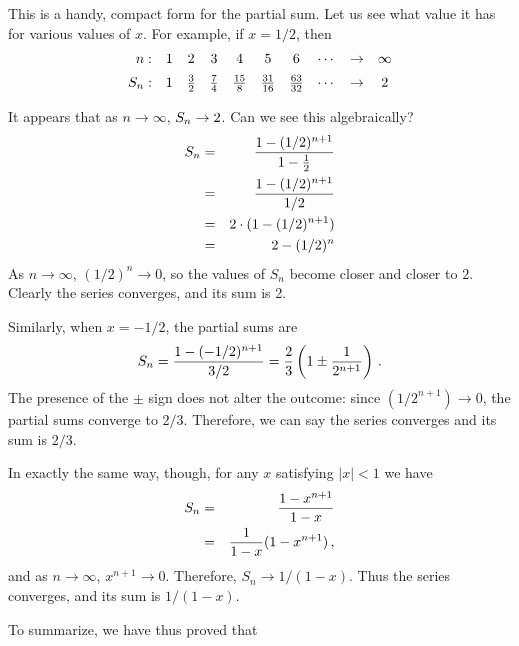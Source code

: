{{{{     This is a handy, compact form for the partial sum.  Let us see what value it has  for various values of $x$.  For example, if $x = 1/2$, then
        \[
\begin{array}{rccccccccc}
        n: & 1 & 2 & 3 & 4 & 5 & 6 & \cdots & \to & \infty
                \\[.07in]
        S_n: & 1 & {3 \over 2}  & {7 \over 4}  & {15 \over 8}  
                & {31 \over 16}  & {63 \over 32}  & \cdots & \to 
                & 2  
        \end{array}
\]


It appears that as $n \to \infty$, $S_n \to 2 \/$.  
Can we see this algebraically?
\begin{eqnarray*}
S_n & = & {\displaystyle {1 - (1/2)^{n+1} \over 1 - {1 \over 2}}} \\
    &=& {\displaystyle {1 - (1/2)^{n+1} \over 1/2}} \\
    & = & 2 \cdot (1 - (1/2)^{n+1}) \\
    &=&2-(1/2)^n 
\end{eqnarray*}
As $n \to \infty$, $(1/2)^n \to 0$, so the values of $S_n$ become closer and closer to $2$.  Clearly the series converges, and its sum is 2.

     Similarly, 
when $x = -1/2$, the partial sums are
        \[
S_n = {1 - (-1/2)^{n+1} \over 3/2} =
                {2 \over 3} \left(
                1 \pm { 1 \over 2^{n+1}} \right)\, .
\]
The presence of the $\pm$ sign does not alter the outcome: since \mbox{$(1/2^{n+1}) \to 0$}, the partial sums converge to $2/3$.  Therefore, we can say the series converges and its sum is $2/3$.

In exactly the same way, though, for any $x$ satisfying $|x|<1$ we have
\begin{eqnarray*}
        S_n &=  &{1 - x^{n+1} \over 1-x} \\
            & = &{1 \over 1-x}(1-x^{n+1}) \, ,
\end{eqnarray*}
and as $n \to \infty$, $x^{n+1} \to 0$.  Therefore, $S_n \to 1/(1-x)$.  Thus the series converges, and its sum is $1/(1-x)$.

To summarize, we have thus proved that

\noindent
\begin{center}
\end{center}}}}}

